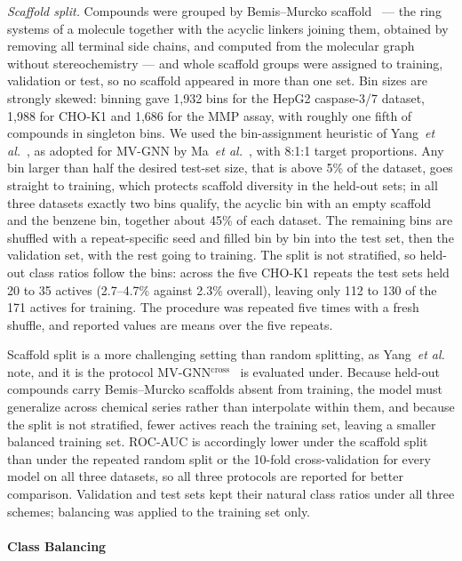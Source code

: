 \documentclass[letterpaper]{article}
\begin{document}
\emph{Scaffold split.} Compounds were grouped by Bemis--Murcko scaffold~\cite{bemis1996properties} --- the ring systems of a molecule together with the acyclic linkers joining them, obtained by removing all terminal side chains, and computed from the molecular graph without stereochemistry --- and whole scaffold groups were assigned to training, validation or test, so no scaffold appeared in more than one set.  Bin sizes are strongly skewed: binning gave 1,932 bins for the HepG2 caspase-3/7 dataset, 1,988 for CHO-K1 and 1,686 for the MMP assay, with roughly one fifth of compounds in singleton bins. We used the bin-assignment heuristic of Yang~\textit{et al.}~\cite{yang2019analyzing}, as adopted for MV-GNN by Ma~\textit{et al.}~\cite{ma2022cross}, with 8:1:1 target proportions. Any bin larger than half the desired test-set size, that is above 5\% of the dataset, goes straight to training, which protects scaffold diversity in the held-out sets; in all three datasets exactly two bins qualify, the acyclic bin with an empty scaffold and the benzene bin, together about 45\% of each dataset. The remaining bins are shuffled with a repeat-specific seed and filled bin by bin into the test set, then the validation set, with the rest going to training. The split is not stratified, so held-out class ratios follow the bins: across the five CHO-K1 repeats the test sets held 20 to 35 actives (2.7--4.7\% against 2.3\% overall), leaving only 112 to 130 of the 171 actives for training. The procedure was repeated five times with a fresh shuffle, and reported values are means over the five repeats.

Scaffold split is a more challenging setting than random splitting, as
Yang~\textit{et al.}~\cite{yang2019analyzing} note, and it is the protocol
MV-GNN$^{\text{cross}}$~\cite{ma2020multiview,ma2022cross} is evaluated under.
Because held-out compounds carry Bemis--Murcko scaffolds absent from training,
the model must generalize across chemical series rather than interpolate
within them, and because the split is not stratified, fewer actives reach the
training set, leaving a smaller balanced training set. ROC-AUC is accordingly
lower under the scaffold split than under the repeated random split or the
10-fold cross-validation for every model on all three datasets, so all three
protocols are reported for better comparison. Validation and test sets kept
their natural class ratios under all three schemes; balancing was applied to
the training set only.

\paragraph{Class Balancing}
\end{document}
